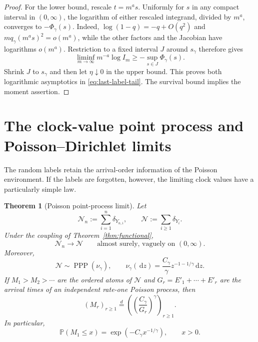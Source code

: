 \documentclass[11pt]{article}
\numberwithin{equation}{section}
\newtheorem{theorem}{Theorem}[section]
\theoremstyle{definition}
\theoremstyle{remark}
\newcommand{\Pp}{\mathbb P}
\newcommand{\PPP}{\operatorname{PPP}}
\newcommand{\dd}{\,\mathrm d}
\begin{document}
\begin{proof}
For the lower bound, rescale $t=m^a s$.  Uniformly for $s$ in any compact
interval in $(0,\infty)$, the logarithm of either rescaled integrand,
divided by $m^a$, converges to $-\Phi_\gamma(s)$.  Indeed,
$\log(1-q)=-q+O(q^2)$ and
$m q_\gamma(m^a s)^2=o(m^a)$, while the other factors and the Jacobian
have logarithms $o(m^a)$.  Restriction to a fixed interval $J$ around
$s_\gamma$ therefore gives
\[
  \liminf_{m\to\infty}m^{-a}\log I_m
  \geq-\sup_{s\in J}\Phi_\gamma(s).
\]
Shrink $J$ to $s_\gamma$ and then let $\eta\downarrow0$ in the upper
bound.  This proves both logarithmic asymptotics in
\eqref{eq:last-label-tail}.  The survival bound implies the moment
assertion.
\end{proof}

\section{The clock-value point process and Poisson--Dirichlet limits}
\label{sec:ppp}

The random labels retain the arrival-order information of the Poisson environment.  If the labels are forgotten, however, the limiting clock values have a particularly simple law.

\begin{theorem}[Poisson point-process limit]
\label{thm:ppp}
Let
\[
  \mathcal N_n:=\sum_{i=1}^n\delta_{Y_{n,i}},
  \qquad
  \mathcal N:=\sum_{i\geq1}\delta_{Y_i}.
\]
Under the coupling of Theorem~\ref{thm:functional},
\begin{equation}
  \mathcal N_n\longrightarrow\mathcal N
  \qquad\text{almost surely, vaguely on }(0,\infty).
  \label{eq:vague-convergence}
\end{equation}
Moreover,
\begin{equation}
  \mathcal N\sim\PPP(\nu_\gamma),
  \qquad
  \nu_\gamma(\dd z)
  =\frac{C_\gamma}{\gamma}z^{-1-1/\gamma}\dd z.
  \label{eq:ppp-intensity}
\end{equation}
If $M_1>M_2>\cdots$ are the ordered atoms of $\mathcal N$ and
$G_r=E'_1+\cdots+E'_r$ are the arrival times of an independent rate-one
Poisson process, then
\begin{equation}
  (M_r)_{r\geq1}
  \stackrel{d}{=}
  \left(\left(\frac{C_\gamma}{G_r}\right)^\gamma\right)_{r\geq1}.
  \label{eq:ordered-clock-values}
\end{equation}
In particular,
\begin{equation}
  \Pp(M_1\leq x)=\exp\left(-C_\gamma x^{-1/\gamma}\right),
  \qquad x>0.
  \label{eq:frechet-maximum}
\end{equation}
\end{theorem}
\end{document}
